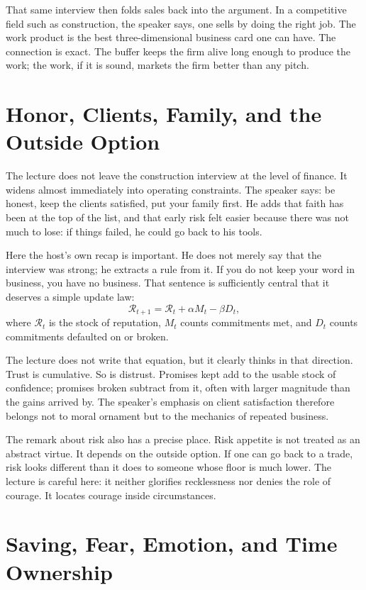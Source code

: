 That same interview then folds sales back into the argument. In a competitive field such as construction, the speaker says, one sells by doing the right job. The work product is the best three-dimensional business card one can have. The connection is exact. The buffer keeps the firm alive long enough to produce the work; the work, if it is sound, markets the firm better than any pitch.

\section{Honor, Clients, Family, and the Outside Option}

The lecture does not leave the construction interview at the level of finance. It widens almost immediately into operating constraints. The speaker says: be honest, keep the clients satisfied, put your family first. He adds that faith has been at the top of the list, and that early risk felt easier because there was not much to lose: if things failed, he could go back to his tools.

Here the host's own recap is important. He does not merely say that the interview was strong; he extracts a rule from it. If you do not keep your word in business, you have no business. That sentence is sufficiently central that it deserves a simple update law:
\begin{equation}
\mathcal{R}_{t+1} = \mathcal{R}_t + \alpha M_t - \beta D_t,
\end{equation}
where \(\mathcal{R}_t\) is the stock of reputation, \(M_t\) counts commitments met, and \(D_t\) counts commitments defaulted on or broken.

The lecture does not write that equation, but it clearly thinks in that direction. Trust is cumulative. So is distrust. Promises kept add to the usable stock of confidence; promises broken subtract from it, often with larger magnitude than the gains arrived by. The speaker's emphasis on client satisfaction therefore belongs not to moral ornament but to the mechanics of repeated business.

The remark about risk also has a precise place. Risk appetite is not treated as an abstract virtue. It depends on the outside option. If one can go back to a trade, risk looks different than it does to someone whose floor is much lower. The lecture is careful here: it neither glorifies recklessness nor denies the role of courage. It locates courage inside circumstances.

\section{Saving, Fear, Emotion, and Time Ownership}


